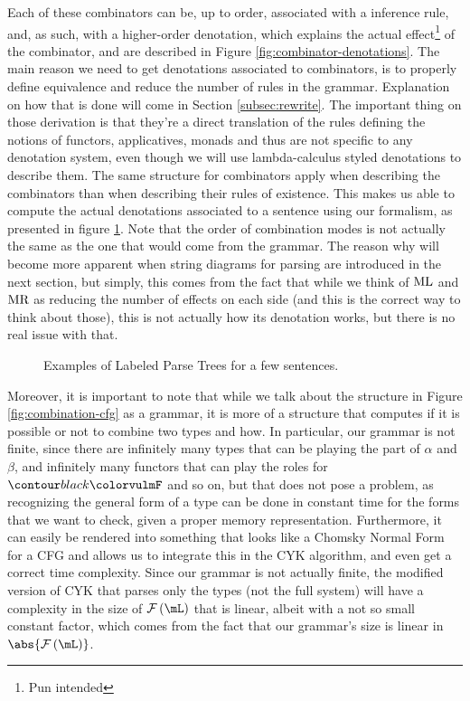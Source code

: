 Each of these combinators can be, up to order, associated with a inference
rule, and, as such, with a higher-order denotation, which explains the actual
effect\footnote{Pun intended} of the combinator, and are described in
Figure \ref{fig:combinator-denotations}.
The main reason we need to get denotations associated to combinators, is to
properly define equivalence and reduce the number of rules in the grammar.
Explanation on how that is done will come in Section \ref{subsec:rewrite}.
The important thing on those derivation is that they're a direct translation
of the rules defining the notions of functors, applicatives, monads and thus
are not specific to any denotation system, even though we will use
lambda-calculus styled denotations to describe them.
The same structure for combinators apply when describing the combinators
than when describing their rules of existence.
This makes us able to compute the actual denotations associated to a sentence
using our formalism, as presented in figure \ref{fig:parsing-trees}.
Note that the order of combination modes is not actually the same as the one
that would come from the grammar.
The reason why will become more apparent when string diagrams for parsing are
introduced in the next section, but simply, this comes from the fact that while
we think of $\text{ML}$ and $\text{MR}$ as reducing the number of effects on each
side (and this is the correct way to think about those), this is not actually
how its denotation works, but there is no real issue with that.

\begin{figure}
	\centering
	
	\caption{Examples of Labeled Parse Trees for a few sentences.}
	\label{fig:parsing-trees}
\end{figure}


\medskip

Moreover, it is important to note that while we talk about the structure in
Figure \ref{fig:combination-cfg} as a grammar, it is more of a structure that
computes if it is possible or not to combine two types and how.
In particular, our grammar is not finite, since there are infinitely many types
that can be playing the part of $\alpha$ and $\beta$, and infinitely many
functors that can play the roles for $\f{F}$ and so on, but that does not pose
a problem, as recognizing the general form of a type can be done in constant
time for the forms that we want to check, given a proper memory representation.
Furthermore, it can easily be rendered into something that looks like a
Chomsky Normal Form for a CFG and allows us to integrate this in the CYK
algorithm, and even get a correct time complexity.
Since our grammar is not actually finite, the modified version of CYK that
parses only the types (not the full system) will have a complexity in the
size of $\mFunc\left(\mL\right)$ that is linear, albeit with a not so
small constant factor, which comes from the fact that our grammar's size is
linear in $\abs{\mFunc\left(\mL\right)}$.


